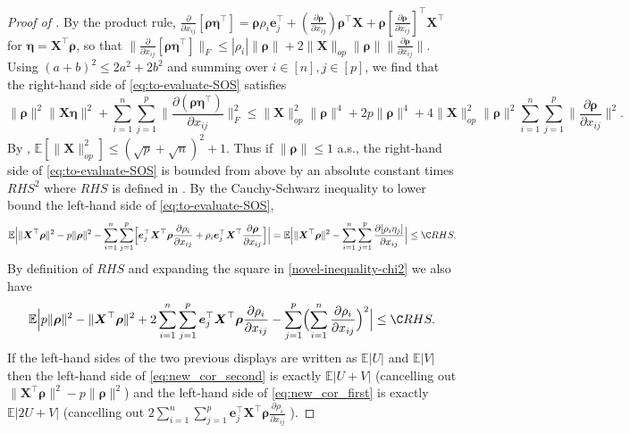 \documentclass[11pt]{amsart}
\numberwithin{equation}{section}
\numberwithin{equation}{section}
\def\E{{\mathbb{E}}}
\def\mathbold{\boldsymbol} %
\def\be{\mathbold{e}}
\def\bX{\mathbold{X}}\def\hbX{{\widehat{\bX}}}\def\tbX{{\widetilde{\bX}}}\def\bXbar{{\overline \bX}}
\def\bfeta{\mathbold{\eta}}\def\etahat{\widehat{\eta}}\def\heta{\widehat{\eta}}
\def\brho{\mathbold{\rho}}\def\rhohat{\widehat{\rho}}\def\hrho{\widehat{\rho}}
\begin{document}
\begin{proof}[Proof of ]
    By the product rule,
    $\frac{\partial}{\partial x_{ij}}[\brho\bfeta^\top]
    =
    \brho\rho_i \be_j^\top
    +
    (
    \frac{\partial\brho}{\partial x_{ij}}
    ) \brho^\top\bX
    +
    \brho
    [
    \frac{\partial\brho}{\partial x_{ij}}
    ]^\top\bX^\top$
    for $\bfeta=\bX^\top\brho$, 
    so that
    $
    \|\frac{\partial}{\partial x_{ij}}
    [\brho\bfeta^\top]
    \|_F
    \le |\rho_i| \|\brho\|
    + 2\|\bX\|_{op}\|\brho\| 
    \|\frac{\partial\brho}{\partial x_{ij}}\|
    $.
    Using $(a+b)^2\le 2a^2+2b^2$ and summing over $i\in[n],j\in[p]$,
    we find that
    the right-hand side of \eqref{eq:to-evaluate-SOS} satisfies
    $$
    \|\brho\|^2\|\bX\bfeta\|^2
    +\sum_{i=1}^n\sum_{j=1}^p
    \|\frac{\partial(\brho\bfeta^\top)}{\partial x_{ij}}\|_F^2
    \le 
    \|\bX\|_{op}^2\|\brho\|^4
    +
    2 p \|\brho\|^4
    + 4 \|\bX\|_{op}^2 \|\brho\|^2 
    \sum_{i=1}^n\sum_{j=1}^p
    \|\frac{\partial\brho}{\partial x_{ij}}\|^2
    .
    $$
    By ,
    $\E[\|\bX\|_{op}^2]\le (\sqrt p + \sqrt n)^2 + 1$.
    Thus if $\|\brho\|\le 1$ a.s., the right-hand side of \eqref{eq:to-evaluate-SOS}
    is bounded from above by an absolute constant times
    $RHS^2$ where $RHS$ is defined in 
    . By the Cauchy-Schwarz inequality to lower bound
    the left-hand side of
    \eqref{eq:to-evaluate-SOS}, 
    \begin{equation*}
    \E\Big|\|\bX^\top\brho\|^2 - p \|\brho\|^2 
    -
    \sum_{i=1}^n\sum_{j=1}^p 
    \Bigl[
    \be_j^\top\bX^\top\brho \frac{\partial \rho_i}{\partial x_{ij}}
    +
    \rho_i\be_j^\top\bX^\top
    \frac{\partial \brho}{\partial x_{ij}}
    \Bigr]
    \Big|
    =
    \E\Big|\|\bX^\top\brho\|^2 -\sum_{i=1}^n\sum_{j=1}^p \frac{\partial[\rho_i \eta_j]}{\partial x_{ij}} \Big|
    \le \C RHS.
    \end{equation*}
    By definition of $RHS$ and expanding the square in
    \eqref{novel-inequality-chi2} we also have
    $$
    \E\Big| p \|\brho\|^2  - \|\bX^\top\brho\|^2
    +2
    \sum_{i=1}^n\sum_{j=1}^p 
    \be_j^\top\bX^\top\brho \frac{\partial \rho_i}{\partial x_{ij}}
    -
    \sum_{j=1}^p 
    \Bigl(
    \sum_{i=1}^n
    \frac{\partial \rho_i}{\partial x_{ij}}
    \Bigr)^2
    \Big|
    \le \C RHS.
    $$
    If the left-hand sides of the two previous displays are written as
    $\E|U|$ and $\E|V|$ then the left-hand side of
    \eqref{eq:new_cor_second} is exactly $\E|U+V|$
    (cancelling out
    $\|\bX^\top\brho\|^2 - p \|\brho\|^2$)
    and the left-hand side of
    \eqref{eq:new_cor_first} is exactly $\E|2U+V|$
    (cancelling out
    $2
    \sum_{i=1}^n\sum_{j=1}^p 
    \be_j^\top\bX^\top\brho \frac{\partial \rho_i}{\partial x_{ij}}$
    ).
    
\end{proof}
\end{document}
